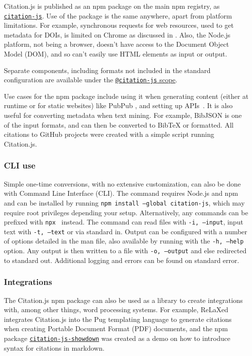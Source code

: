 \documentclass[fleqn,10pt,lineno]{wlpeerj} %
\begin{document}
Citation.js is published as an npm package on the main npm registry, as \href{https://npm.im/citation-js}{\texttt{citation-js}}. Use of the package is the same anywhere, apart from platform limitations. For example, synchronous requests for web resources, used to get metadata for DOIs, is limited on Chrome as discussed in \cite{willighagen_make_2017}. Also, the Node.js platform, not being a browser, doesn't have access to the Document Object Model (DOM), and so can't easily use HTML elements as input or output.

Separate components, including formats not included in the standard configuration are available under the \href{https://www.npmjs.com/org/citation-js}{\texttt{@citation-js} scope}.

Use cases for the npm package include using it when generating content (either at runtime or for static websites) like PubPub \citep{shihipar_pubpub:_2018}, and setting up APIs~\citep{willighagen_citation.js:_2017}. It is also useful for converting metadata when text mining. For example, BibJSON is one of the input formats, and can then be converted to BibTeX or formatted. All citations to GitHub projects were created with a simple script running Citation.js.

\subsubsection*{CLI use}

Simple one-time conversions, with no extensive customization, can also be done with Command Line Interface (CLI). The command requires Node.js and npm and can be installed by running \texttt{npm install --global citation-js}, which may require root privileges depending your setup. Alternatively, any commands can be prefixed with \texttt{npx } instead. The command can read files with \texttt{-i, --input}, input text with \texttt{-t, --text} or via standard in. Output can be configured with a number of options detailed in the man file, also available by running with the \texttt{-h, --help} option. Any output is then written to a file with \texttt{-o, --output} and else redirected to standard out. Additional logging and errors can be found on standard error.

\subsubsection*{Integrations}

The Citation.js npm package can also be used as a library to create integrations with, among other things, word processing systems. For example, ReLaXed \citep{null2018RelaxedJS/ReLaXed} integrates Citation.js into the Pug templating language to generate citations when creating Portable Document Format (PDF) documents, and the npm package \href{https://npm.im/citation-js-showdown}{\texttt{citation-js-showdown}} was created as a demo on how to introduce syntax for citations in markdown.
\end{document}
